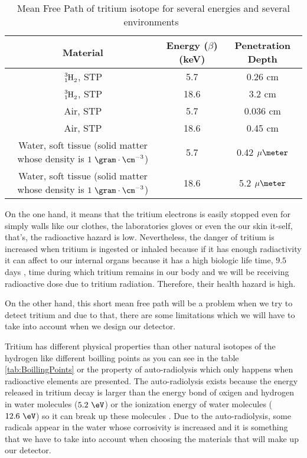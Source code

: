 \begin{table}[htbp]
\begin{center}
\begin{tabular}{|c|c|c|}
\hline
Material & Energy ($\beta$)(keV) & Penetration Depth \\
\hline \hline \hline
$\ce{\ce{^{3}_{1}H_2}}$, STP & 5.7 & 0.26 cm \\ \hline
$\ce{\ce{^{3}_{1}H_2}}$, STP & 18.6 & 3.2 cm \\ \hline
Air, STP & 5.7 & 0.036 cm \\ \hline
Air, STP & 18.6 & 0.45 cm \\ \hline
\parbox{10em}{\centering Water, soft tissue\\  (solid matter whose \\  density is $1~\gram\cdot\cm^{-3}$)} & 5.7 & 0.42 $\mu\meter$\\ \hline
\parbox{10em}{\centering Water, soft tissue\\  (solid matter whose \\  density is $1~\gram\cdot\cm^{-3}$)} & 18.6 & 5.2 $\mu\meter$ \\ \hline
\end{tabular}
\caption{Mean Free Path of tritium isotope for several energies and several environments~\cite{TritiumHandling}}
\label{tab:MeanFreePathTritium}
\end{center}
\end{table}

On the one hand, it means that the tritium electrons is easily stopped even for simply walls like our clothes, the laboratories gloves or even the our skin it-self, that's, the radioactive hazard is low. Nevertheless, the danger of tritium is increased when tritium is ingested or inhaled because if it has enough radiactivity it can affect to our internal organs because it has a high biologic life time, $9.5$ days \cite{TritiumHandling}, time during which tritium remains in our body and we will be receiving radioactive dose due to tritium radiation. Therefore, their health hazard is high.

On the other hand, this short mean free path will be a problem when we try to detect tritium and due to that, there are some limitations which we will have to take into account when we design our detector. 

Tritium has different physical properties than other natural isotopes of the hydrogen like different boilling points as you can see in the table \ref{tab:BoillingPoints} or the property of auto-radiolysis which only happens when radioactive elements are presented. The auto-radiolysis exists because the energy released in tritium decay is larger than the energy bond of oxigen and hydrogen in water molecules ($5.2~\eV$) or the ionization energy of water molecules ($12.6~\eV$) so it can break up these molecules \cite{AutoRadyolisis}. Due to the auto-radiolysis, some radicals appear in the water whose corrosivity is increased and it is something that we have to take into account when choosing the materials that will make up our detector.

